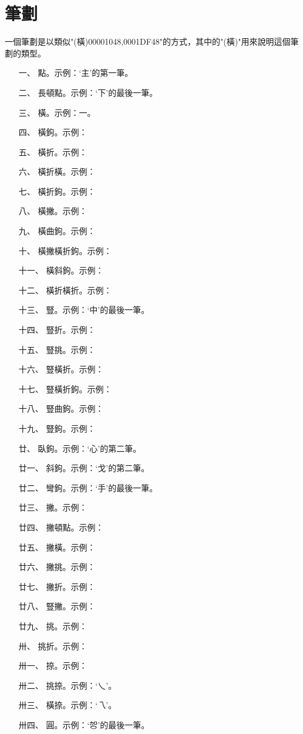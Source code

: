 \section{筆劃}
一個筆劃是以類似"(橫)00001048,0001DF48"的方式，其中的"(橫)"用來說明這個筆劃的類型。
\begin{enumerate}
\item[一、]點。示例：`主'的第一筆。
\item[二、]長頓點。示例：`下'的最後一筆。

\item[三、]橫。示例：一。
\item[四、]橫鉤。示例：
\item[五、]橫折。示例：
\item[六、]橫折橫。示例：
\item[七、]橫折鉤。示例：
\item[八、]橫撇。示例：
\item[九、]橫曲鉤。示例：
\item[十、]橫撇橫折鉤。示例：
\item[十一、]橫斜鉤。示例：
\item[十二、]橫折橫折。示例：

\item[十三、]豎。示例：`中'的最後一筆。
\item[十四、]豎折。示例：
\item[十五、]豎挑。示例：
\item[十六、]豎橫折。示例：
\item[十七、]豎橫折鉤。示例：
\item[十八、]豎曲鉤。示例：
\item[十九、]豎鉤。示例：
\item[廿、]臥鉤。示例：`心'的第二筆。
\item[廿一、]斜鉤。示例：`戈'的第二筆。
\item[廿二、]彎鉤。示例：`手'的最後一筆。

\item[廿三、]撇。示例：
\item[廿四、]撇頓點。示例：
\item[廿五、]撇橫。示例：
\item[廿六、]撇挑。示例：
\item[廿七、]撇折。示例：
\item[廿八、]豎撇。示例：
\item[廿九、]挑。示例：
\item[卅、]挑折。示例：
\item[卅一、]捺。示例：

\item[卅二、]挑捺。示例：`乀'。
\item[卅三、]橫捺。示例：`乁'。
\item[卅四、]圓。示例：`㔔'的最後一筆。
\end{enumerate}


